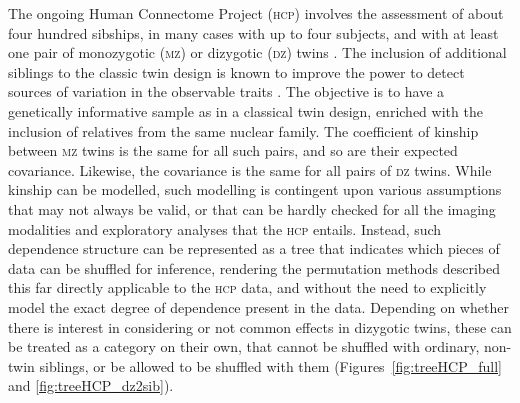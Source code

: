 The ongoing Human Connectome Project (\textsc{hcp}) involves the assessment of about four hundred sibships, in many cases with up to four subjects, and with at least one pair of monozygotic (\textsc{mz}) or dizygotic (\textsc{dz}) twins \citep{VanEssen2012, VanEssen2013}. The inclusion of additional siblings to the classic twin design is known to improve the power to detect sources of variation in the observable traits \citep{Posthuma2000, Keller2010}. The objective is to have a genetically informative sample as in a classical twin design, enriched with the inclusion of relatives from the same nuclear family. The coefficient of kinship between \textsc{mz} twins is the same for all such pairs, and so are their expected covariance. Likewise, the covariance is the same for all pairs of \textsc{dz} twins. While kinship can be modelled, such modelling is contingent upon various assumptions that may not always be valid, or that can be hardly checked for all the imaging modalities and exploratory analyses that the \textsc{hcp} entails. Instead, such dependence structure can be represented as a tree that indicates which pieces of data can be shuffled for inference, rendering the permutation methods described this far directly applicable to the \textsc{hcp} data, and without the need to explicitly model the exact degree of dependence present in the data. Depending on whether there is interest in considering or not common effects in dizygotic twins, these can be treated as a category on their own, that cannot be shuffled with ordinary, non-twin siblings, or be allowed to be shuffled with them (Figures~\ref{fig:treeHCP_full} and \ref{fig:treeHCP_dz2sib}).

